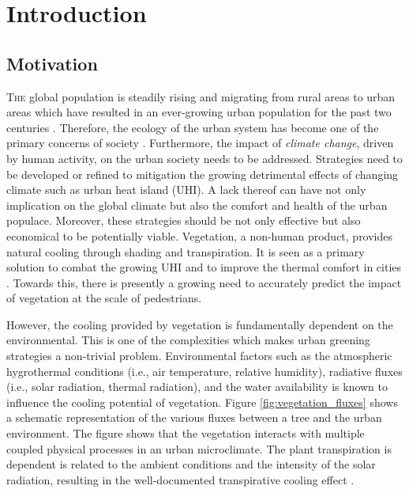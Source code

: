 \chapter{Introduction}
\label{ch:introduction}

\def\figdir{chapters/ch01_introduction/figures}


%		

\section{Motivation}

\lettrine[lines=3,nindent=0em,loversize=0.1]{T}{he} global population is steadily rising and migrating from rural areas to urban areas which have resulted in an ever-growing urban population for the past two centuries \citep{Oke2017a}. Therefore, the ecology of the urban system has become one of the primary concerns of society \citep{pachauri2014climate}. Furthermore, the impact of \textit{climate change}, driven by human activity, on the urban society needs to be addressed. Strategies need to be developed or refined to mitigation the growing detrimental effects of changing climate such as urban heat island (UHI). A lack thereof can have not only implication on the global climate but also the comfort and health of the urban populace. Moreover, these strategies should be not only effective but also economical to be potentially viable. Vegetation, a non-human product, provides natural cooling through shading and transpiration. It is seen as a primary solution to combat the growing UHI and to improve the thermal comfort in cities \citep{Gillner2015, Bowler2010, Loughner2012}. Towards this, there is presently a growing need to accurately predict the impact of vegetation at the scale of pedestrians.

However, the cooling provided by vegetation is fundamentally dependent on the environmental. This is one of the complexities which makes urban greening strategies a non-trivial problem. Environmental factors such as the atmospheric hygrothermal conditions (i.e., air temperature, relative humidity), radiative fluxes (i.e., solar radiation, thermal radiation), and the water availability is known to influence the cooling potential of vegetation. Figure \ref{fig:vegetation_fluxes} shows a schematic representation of the various fluxes between a tree and the urban environment. The figure shows that the vegetation interacts with multiple coupled physical processes in an urban microclimate. The plant transpiration is dependent is related to the ambient conditions and the intensity of the solar radiation, resulting in the well-documented transpirative cooling effect \citep{Oke2017,Farquhar2007,abtew2012evaporation,Melesse2008}.

